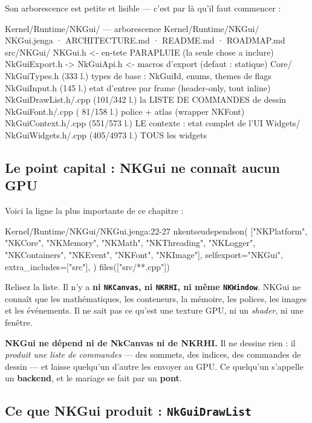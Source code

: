 Son arborescence est petite et lisible — c'est par là qu'il faut commencer :

\begin{nkcode}{Kernel/Runtime/NKGui/ — arborescence}
Kernel/Runtime/NKGui/
  NKGui.jenga · ARCHITECTURE.md · README.md · ROADMAP.md
  src/NKGui/
    NKGui.h                     <- en-tete PARAPLUIE (la seule chose a inclure)
    NkGuiExport.h -> NkGuiApi.h <- macros d'export (defaut : statique)
    Core/
      NkGuiTypes.h      (333 l.) types de base : NkGuiId, enums, themes de flags
      NkGuiInput.h      (145 l.) etat d'entree par frame (header-only, tout inline)
      NkGuiDrawList.h/.cpp (101/342 l.) la LISTE DE COMMANDES de dessin
      NkGuiFont.h/.cpp  ( 81/158 l.) police + atlas (wrapper NKFont)
      NkGuiContext.h/.cpp (551/573 l.) LE contexte : etat complet de l'UI
    Widgets/
      NkGuiWidgets.h/.cpp (405/4973 l.) TOUS les widgets
\end{nkcode}

\subsection{Le point capital : NKGui ne connaît aucun GPU}

Voici la ligne la plus importante de ce chapitre :

\begin{nkcode}{Kernel/Runtime/NKGui/NKGui.jenga:22-27}
nkentseudependson(
    ["NKPlatform", "NKCore", "NKMemory", "NKMath", "NKThreading",
     "NKLogger", "NKContainers", "NKEvent", "NKFont", "NKImage"],
    selfexport="NKGui",
    extra_includes=["src"],
)
files(["src/**.cpp"])
\end{nkcode}

Relisez la liste. Il n'y a \textbf{ni \texttt{NKCanvas}, ni \texttt{NKRHI}, ni
même \texttt{NKWindow}}. NKGui ne connaît que les mathématiques, les conteneurs,
la mémoire, les polices, les images et les événements. Il ne sait pas ce qu'est
une texture GPU, ni un \emph{shader}, ni une fenêtre.

\begin{nkretenir}
\textbf{NKGui ne dépend ni de NkCanvas ni de NKRHI.} Il ne dessine rien : il
\emph{produit une liste de commandes} — des sommets, des indices, des commandes
de dessin — et laisse quelqu'un d'autre les envoyer au GPU. Ce quelqu'un
s'appelle un \textbf{backend}, et le mariage se fait par un \textbf{pont}.
\end{nkretenir}

\subsection{Ce que NKGui produit : \texttt{NkGuiDrawList}}

